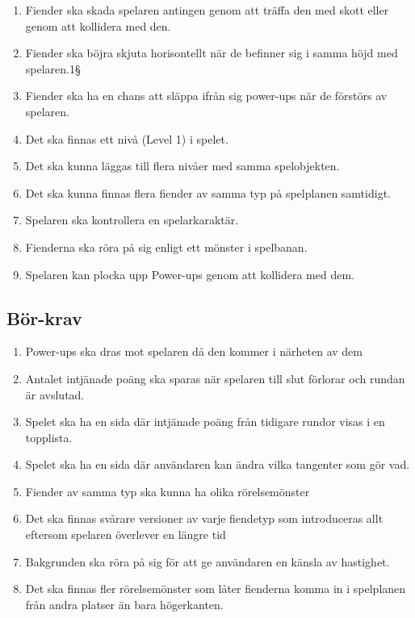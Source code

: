 \documentclass{TDP005mall}
\begin{document}
\begin{enumerate}
\item Fiender ska skada spelaren antingen genom att träffa den med skott eller genom att kollidera med den.
\item Fiender ska böjra skjuta horisontellt när de befinner sig i samma höjd med spelaren.1§
\item Fiender ska ha en chans att släppa ifrån sig power-ups när de förstörs av spelaren.
\item Det ska finnas ett nivå (Level 1) i spelet.
\item Det ska kunna läggas till flera nivåer med samma spelobjekten.
\item Det ska kunna finnas flera fiender av samma typ på spelplanen samtidigt.
\item Spelaren ska kontrollera en spelarkaraktär.
\item Fienderna ska röra på sig enligt ett mönster i spelbanan.
\item Spelaren kan plocka upp Power-ups genom att kollidera med dem.
\end{enumerate}

\subsection{Bör-krav}
\begin{enumerate}
\item Power-ups ska dras mot spelaren då den kommer i närheten av dem
\item Antalet intjänade poäng ska sparas när spelaren till slut förlorar och rundan är avslutad.
\item Spelet ska ha en sida där intjänade poäng från tidigare rundor visas i en topplista.
\item Spelet ska ha en sida där användaren kan ändra vilka tangenter som gör vad.
\item Fiender av samma typ ska kunna ha olika rörelsemönster
\item Det ska finnas svårare versioner av varje fiendetyp som introduceras allt eftersom spelaren överlever en längre tid
\item Bakgrunden ska röra på sig för att ge användaren en känsla av hastighet.
\item Det ska finnas fler rörelsemönster som låter fienderna komma in i spelplanen från andra platser än bara högerkanten.

\end{enumerate}
\end{document}
